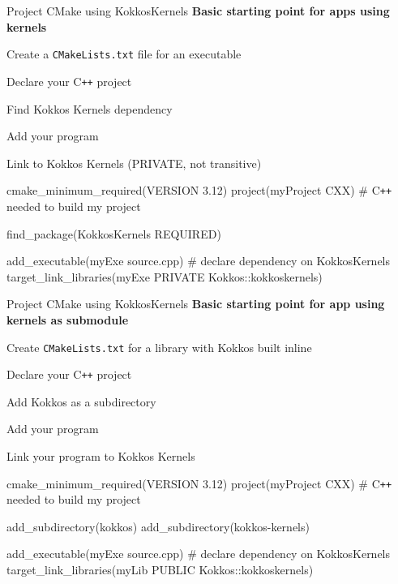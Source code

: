 \begin{frame}[fragile]{Project CMake using KokkosKernels}
\textbf{Basic starting point for apps using kernels }
\begin{itemize}
\item Create a \texttt{CMakeLists.txt} file for an executable
 { \item Declare your C\texttt{++} project }
 { \item Find Kokkos Kernels dependency }
 { \item Add your program }
 { \item Link to Kokkos Kernels (PRIVATE, not transitive) }
\end{itemize}

\begin{cmake}[linebackground={
  \btLstHL<2>{2}{orange!30}
  \btLstHL<3>{4}{orange!30}
  \btLstHL<4>{6}{orange!30}
  \btLstHL<5>{8-9}{orange!30}    
}]
    cmake_minimum_required(VERSION 3.12)
    project(myProject CXX) # C\texttt{++} needed to build my project

    find_package(KokkosKernels REQUIRED)

    add_executable(myExe source.cpp)
    # declare dependency on KokkosKernels
    target_link_libraries(myExe PRIVATE 
                 Kokkos::kokkoskernels)
\end{cmake}
\end{frame}

\begin{frame}[fragile]{Project CMake using KokkosKernels}
\textbf{Basic starting point for app using kernels as submodule}
\begin{itemize}
\item Create \texttt{CMakeLists.txt} for a library with Kokkos built inline
 { \item Declare your C\texttt{++} project }
 { \item Add Kokkos as a subdirectory }
 { \item Add your program  }
 { \item Link your program to Kokkos Kernels }
\end{itemize}

\begin{cmake}[linebackground={
  \btLstHL<2>{2}{orange!30}
  \btLstHL<3>{4-5}{orange!30}
  \btLstHL<4>{8}{orange!30}
  \btLstHL<5>{10-11}{orange!30}    
}]
    cmake_minimum_required(VERSION 3.12)
    project(myProject CXX) # C\texttt{++} needed to build my project

    add_subdirectory(kokkos)
    add_subdirectory(kokkos-kernels)

    add_executable(myExe source.cpp)
    # declare dependency on KokkosKernels
    target_link_libraries(myLib PUBLIC 
                 Kokkos::kokkoskernels)
\end{cmake}
\end{frame}

